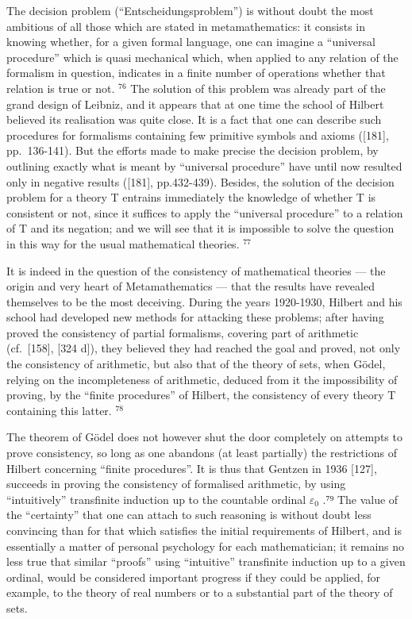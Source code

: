 The decision problem (``Entscheidungsproblem'') is without doubt the most ambitious of all those which are stated in metamathematics: it consists in knowing whether, for a given formal language, one can imagine a ``universal procedure'' which is quasi mechanical which, when applied to any relation of the formalism in question, indicates in a finite number of operations whether that relation is true or not. \(^{76}\) The solution of this problem was already part of the grand design of Leibniz, and it appears that at one time the school of Hilbert believed its realisation was quite close. It is a fact that one can describe such procedures for formalisms containing few primitive symbols and axioms ({[}181{]}, pp.~136-141). But the efforts made to make precise the decision problem, by outlining exactly what is meant by ``universal procedure'' have until now resulted only in negative results ({[}181{]}, pp.432-439). Besides, the solution of the decision problem for a theory T entrains immediately the knowledge of whether T is consistent or not, since it suffices to apply the ``universal procedure'' to a relation of T and its negation; and we will see that it is impossible to solve the question in this way for the usual mathematical theories. \(^{77}\)

It is indeed in the question of the consistency of mathematical theories --- the origin and very heart of Metamathematics --- that the results have revealed themselves to be the most deceiving. During the years 1920-1930, Hilbert and his school had developed new methods for attacking these problems; after having proved the consistency of partial formalisms, covering part of arithmetic (cf.~{[}158{]}, {[}324 d{]}), they believed they had reached the goal and proved, not only the consistency of arithmetic, but also that of the theory of sets, when Gödel, relying on the incompleteness of arithmetic, deduced from it the impossibility of proving, by the ``finite procedures'' of Hilbert, the consistency of every theory T containing this latter. \(^{78}\)

The theorem of Gödel does not however shut the door completely on attempts to prove consistency, so long as one abandons (at least partially) the restrictions of Hilbert concerning ``finite procedures''. It is thus that Gentzen in 1936 {[}127{]}, succeeds in proving the consistency of formalised arithmetic, by using ``intuitively'' transfinite induction up to the countable ordinal \(\varepsilon_{0}\) .⁷⁹ The value of the ``certainty'' that one can attach to such reasoning is without doubt less convincing than for that which satisfies the initial requirements of Hilbert, and is essentially a matter of personal psychology for each mathematician; it remains no less true that similar ``proofs'' using ``intuitive'' transfinite induction up to a given ordinal, would be considered important progress if they could be applied, for example, to the theory of real numbers or to a substantial part of the theory of sets.

